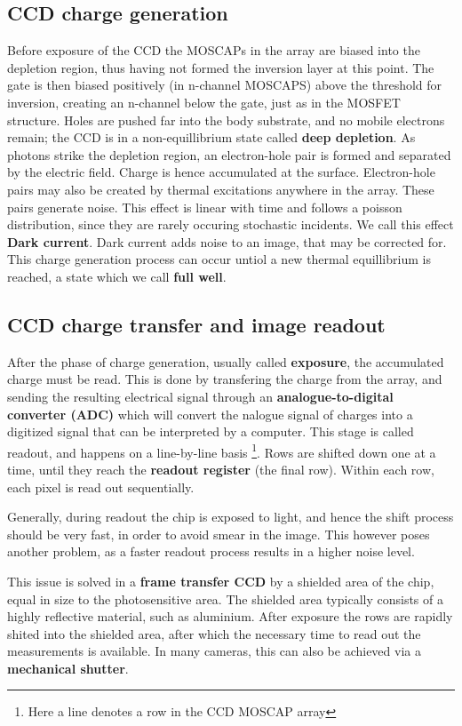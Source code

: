 \documentclass[../main.tex]{subfiles}
\begin{document}
	\subsection{CCD charge generation}
	Before exposure of the CCD the MOSCAPs in the array are biased into the depletion region, thus having not formed the inversion layer at this point. The gate is then biased positively (in n-channel MOSCAPS) above the threshold for inversion, creating an n-channel below the gate, just as in the MOSFET structure. Holes are pushed far into the body substrate, and no mobile electrons remain; the CCD is in a non-equillibrium state called \textbf{deep depletion}. As photons strike the depletion region, an electron-hole pair is formed and separated by the electric field. Charge is hence accumulated at the surface. Electron-hole pairs may also be created by thermal excitations anywhere in the array. These pairs generate noise. This effect is linear with time and follows a poisson distribution, since they are rarely occuring stochastic incidents. We call this effect \textbf{Dark current}. Dark current adds noise to an image, that may be corrected for. This charge generation process can occur untiol a new thermal equillibrium is reached, a state which we call \textbf{full well}. 
	
	\subsection{CCD charge transfer and image readout}
	After the phase of charge generation, usually called \textbf{exposure}, the accumulated charge must be read. This is done by transfering the charge from the array, and sending the resulting electrical signal through an \textbf{analogue-to-digital converter (ADC)} which will convert the nalogue signal of charges into a digitized signal that can be interpreted by a computer. This stage is called readout, and happens on a line-by-line basis \footnote{Here a line denotes a row in the CCD MOSCAP array}. Rows are shifted down one at a time, until they reach the \textbf{readout register} (the final row). Within each row, each pixel is read out sequentially.  
	
	Generally, during readout the chip is exposed to light, and hence the shift process should be very fast, in order to avoid smear in the image. This however poses another problem, as a faster readout process results in a higher noise level. 
	
	This issue is solved in a \textbf{frame transfer CCD} by a shielded area of the chip, equal in size to the photosensitive area. The shielded area typically consists of a highly reflective material, such as aluminium. After exposure the rows are rapidly shited into the shielded area, after which the necessary time to read out the measurements is available. In many cameras, this can also be achieved via a \textbf{mechanical shutter}. 
	
\end{document}
